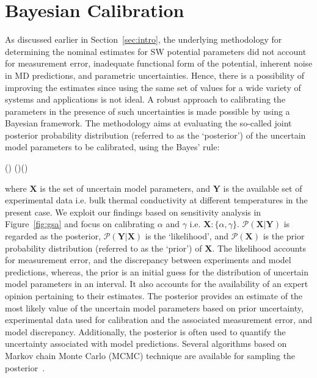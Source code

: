 \section{Bayesian Calibration}
\label{sec:bayes}

As discussed earlier in Section~\ref{sec:intro}, the underlying methodology for determining the nominal 
estimates for SW potential parameters did not account for measurement error, inadequate functional
form of the potential, inherent noise in MD predictions, and parametric uncertainties. Hence, there is
a possibility of improving the estimates since using the same set of values for a wide variety of systems
and applications is not ideal. A robust approach to calibrating the parameters in the presence of
such uncertainties is made possible by using a Bayesian framework. The methodology aims at evaluating
the so-called joint posterior probability distribution (referred to as the `posterior') of the uncertain model 
parameters to be calibrated, using the Bayes' rule:

\be
{}(\vert {}) \propto {}(\vert{})()
\ee

\noindent where $\bm{X}$ is the set of uncertain model parameters, and $\bm{Y}$ is the available set of
experimental data i.e. bulk thermal conductivity at different temperatures in the present case. 
We exploit our findings based on sensitivity analysis in
Figure~\ref{fig:gsa} and focus on calibrating $\alpha$ and $\gamma$ i.e. $\bm{X}:\{\alpha,\gamma\}$.
$\mathcal{P}(\bm{X}\vert \bm{Y})$ is regarded as the posterior, $\mathcal{P}(\bm{Y}\vert\bm{X})$ is the
`likelihood', and $\mathcal{P}(\bm{X})$ is the prior probability distribution (referred to as the `prior') of $\bm{X}$.
The likelihood accounts for measurement error, and the discrepancy between experiments and model
predictions, whereas, the prior is an initial guess for the distribution of uncertain model parameters in an
interval. It also accounts for the availability of an expert opinion pertaining to their estimates. 
The posterior provides an estimate of the most likely value of the uncertain model parameters based on
prior uncertainty, experimental data used for calibration and the associated measurement error, and model
discrepancy. Additionally, the posterior is often used to quantify the uncertainty associated with model predictions. Several algorithms based on Markov chain Monte Carlo (MCMC) technique are available for  
sampling the posterior~\cite{Haario:2001, Haario:2006,Xu:2014}.

